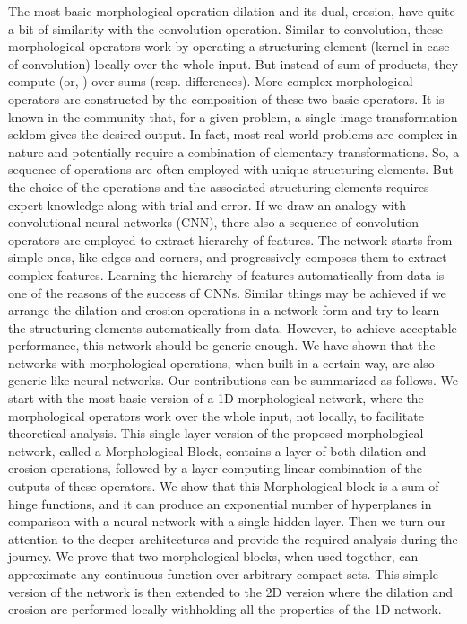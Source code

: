 \documentclass[12pt]{article}
\begin{document}
The most basic morphological operation dilation and its dual, erosion, have quite a bit of similarity with the convolution operation. Similar to convolution, these morphological operators work by operating a structuring element (kernel in case of convolution) locally over the whole input. But instead of sum of products, they compute  (or, ) over sums (resp. differences). More complex morphological operators are constructed by the composition of these two basic operators. It is known in the community that, for a given problem, a single image transformation seldom gives the desired output. In fact, most real-world problems are complex in nature and potentially require a combination of elementary transformations. So, a sequence of operations are often employed with unique structuring elements. But the choice of the operations and the associated structuring elements requires expert knowledge along with trial-and-error. If we draw an analogy with convolutional neural networks (CNN), there also a sequence of convolution operators are employed to extract hierarchy of features. The network starts from simple ones, like edges and corners, and progressively composes them to extract complex features. Learning the hierarchy of features automatically from data is one of the reasons of the success of CNNs. Similar things may be achieved if we arrange the dilation and erosion operations in a network form and try to learn the structuring elements automatically from data. However, to achieve acceptable performance, this network should be generic enough. We have shown that the networks with morphological operations, when built in a certain way, are also generic like neural networks. 
Our contributions can be summarized as follows. We start with the most basic version of a 1D morphological network, where the morphological operators work over the whole input, not locally, to facilitate theoretical analysis. This single layer version of the proposed morphological network, called a Morphological Block, contains a layer of both dilation and erosion operations, followed by a layer computing linear combination of the outputs of these operators. 
We show that this Morphological block is a sum of hinge functions, and it can produce an exponential number of hyperplanes in comparison with a neural network with a single hidden layer. Then we turn our attention to the deeper architectures and provide the required analysis during the journey. We prove that two morphological blocks, when used together, can approximate any continuous function over arbitrary compact sets. This simple version of the network is then extended to the 2D version where the dilation and erosion are performed locally withholding all the properties of the 1D network.  
\end{document}
